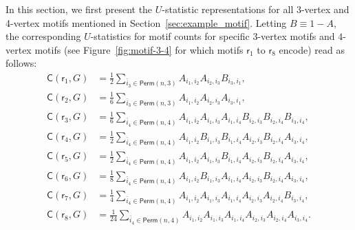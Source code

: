 \documentclass[12pt]{article}
\theoremstyle{plain}
\theoremstyle{definition}
\def\sfr{\mathsf{r}}
\newcommand{\perm}[1]{\mathsf{Perm}(#1)}
\newcommand{\motifrg}[2]{\mathsf{C}(#1,#2)}
\begin{document}
\begin{bibunit}[agsm]
In this section, we first present the $U$-statistic representations for all 3-vertex and 4-vertex motifs mentioned in Section~\ref{sec:example_motif}. Letting $B \equiv 1 - A$, the corresponding $U$-statistics for motif counts for specific $3$-vertex motifs and $4$-vertex motifs (see Figure~\ref{fig:motif-3-4} for which motifs $\sfr_1$ to $\sfr_8$ encode) read as follows:
\begin{align*}
\motifrg{\sfr_1}{G} & = \frac{1}{2} \sum_{ \bar{i}_{3} \in \perm{n,3}}  A_{i_1, i_2} A_{i_2, i_3}  B_{i_3, i_1}, \\ \motifrg{\sfr_2}{G} & = \frac{1}{6} \sum_{ \bar{i}_{3} \in \perm{n,3}}  A_{i_1, i_2} A_{i_2, i_3} A_{i_3, i_1}, \\
\motifrg{\sfr_3}{G} & = \frac{1}{6} \sum_{ \bar{i}_{4} \in \perm{n,4}}  A_{i_1, i_2} A_{i_1, i_3} A_{i_1, i_4} B_{i_2, i_3} B_{i_2, i_4} B_{i_3, i_4}, \\ 
\motifrg{\sfr_4}{G} & = \frac{1}{2} \sum_{ \bar{i}_{4} \in \perm{n,4}}  A_{i_1, i_2} B_{i_1, i_3} B_{i_1, i_4} A_{i_2, i_3} B_{i_2, i_4} A_{i_3, i_4}, \\ 
\motifrg{\sfr_5}{G} & = \frac{1}{2} \sum_{ \bar{i}_{4} \in \perm{n,4}}  A_{i_1, i_2} A_{i_1, i_3} B_{i_1, i_4} A_{i_2, i_3} B_{i_2, i_4} A_{i_3, i_4}, \\ 
\motifrg{\sfr_6}{G} & = \frac{1}{8} \sum_{ \bar{i}_{4} \in \perm{n,4}}  A_{i_1, i_2} B_{i_1, i_3} A_{i_1, i_4} A_{i_2, i_3} B_{i_2, i_4} A_{i_3, i_4}, \\ 
\motifrg{\sfr_7}{G} & = \frac{1}{4} \sum_{ \bar{i}_{4} \in \perm{n,4}}  A_{i_1, i_2} A_{i_1, i_3} A_{i_1, i_4} A_{i_2, i_3} A_{i_2, i_4} B_{i_3, i_4}, \\ 
\motifrg{\sfr_8}{G} & = \frac{1}{24} \sum_{ \bar{i}_{4} \in \perm{n,4}}  A_{i_1, i_2} A_{i_1, i_3} A_{i_1, i_4} A_{i_2, i_3} A_{i_2, i_4} A_{i_3, i_4}.
\end{align*}


\begin{figure}[ht]
    \centering


\end{figure}
\end{bibunit}
\end{document}
